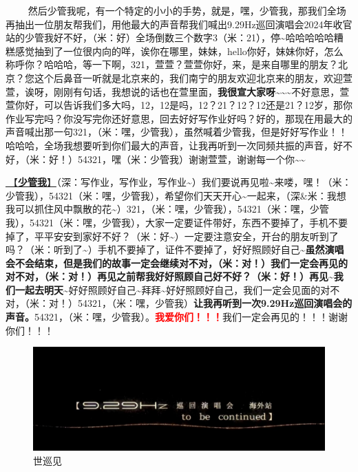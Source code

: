 \documentclass[]{ctexbook}
\begin{document}
   然后少管我呢，有一个特定的小小的手势，就是，嘿，少管我，那我们全场再抽出一位朋友帮我们，用他最大的声音帮我们喊出9.29Hz巡回演唱会2024年收官站的少管我好不好，（米：好）全场倒数三个数字3（米：21），停\textasciitilde 哈哈哈哈哈糟糕感觉抽到了一位很内向的咩，诶你在哪里，妹妹，hello你好，妹妹你好，怎么称呼你？哈哈哈，等一下啊，321，萱萱？萱萱你好，来，是来自哪里的朋友？北京？您这个后鼻音一听就是北京来的，我们南宁的朋友欢迎北京来的朋友，欢迎萱萱，诶呀，刚刚有句话，我想说的话也在萱里面，\textbf{我很宣大家呀\textasciitilde\textasciitilde\textasciitilde{}}不好意思，萱萱你好，可以告诉我们多大吗，12，12是吗，12？21？12？12还是21？12岁，那你作业写完吗？你没写完你还好意思，回去好好写作业好吗？好的，那现在用最大的声音喊出那一句321，（米：嘿，少管我），虽然喊着少管我，但是好好写作业！！哈哈哈，全场我想要听到你们最大的声音，让我再听到一次同频共振的声音，好不好，（米：好！）54321，嘿（米：少管我）谢谢萱萱，谢谢每一个你\textasciitilde\textasciitilde{}

\hyperref[watch-ur-manners]{🎵【\textbf{少管我}】}（深：写作业，写作业，写作业\textasciitilde）我们要说再见啦\textasciitilde 来喽，嘿！（米：少管我），54321（米：嘿，少管我），希望你们天天开心\textasciitilde 一起来，（深\&米：我想我可以抓住风中飘散的花\textasciitilde）321，（米：嘿，少管我），54321（米：嘿，少管我），54321（米：嘿，少管我），大家一定要证件带好，东西不要掉了，手机不要掉了，平平安安到家好不好？（米：好\textasciitilde）一定要注意安全，开台的朋友听到了吗？（米：听到了\textasciitilde）手机不要掉了，证件不要掉了，好好照顾好自己\textasciitilde{}\textbf{虽然演唱会不会结束，但是我们的故事一定会继续对不对，（米：对！）我们一定会再见的对不对，（米：对！）再见之前帮我好好照顾自己好不好？（米：好！）再见\textasciitilde 我们一起去明天\textasciitilde{}}好好照顾好自己\textasciitilde 拜拜\textasciitilde 好好照顾好自己，我们一定会见面的对不对，（米：对！）54321，（米：嘿，少管我）\textbf{让我再听到一次9.29Hz巡回演唱会的声音。}54321，（米：嘿，少管我）。\textbf{\textcolor{red}{我爱你们！！！}}我们一定会再见的！！！谢谢你们！！！

\begin{figure}

{\centering \includegraphics[width=400pt]{img/nanning20241207/006} 

}

\caption{世巡见}\label{fig:unnamed-chunk-167}
\end{figure}
\end{document}
